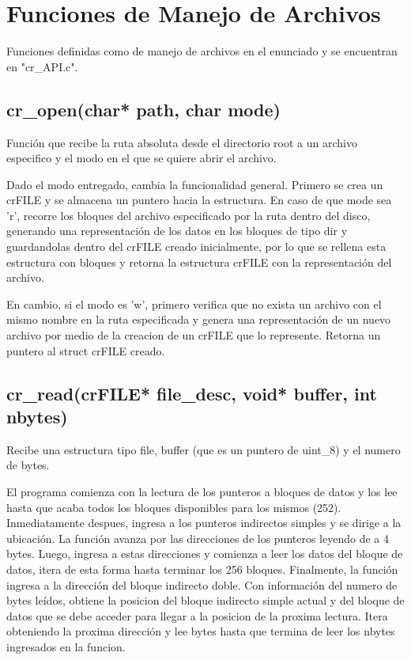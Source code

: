 \documentclass[12pt]{article}
\begin{document}
\section{Funciones de Manejo de Archivos}
Funciones definidas como de manejo de archivos en el enunciado y se encuentran en "cr\_API.c".

\subsection{cr\_open(char* path, char mode)}
Función que recibe la ruta absoluta desde el directorio root a un archivo  especifico y el modo en el que se quiere abrir el archivo.

Dado el modo entregado, cambia la funcionalidad general. Primero se crea un crFILE y se almacena un puntero hacia la estructura. En caso de que mode sea 'r', recorre los bloques del archivo especificado por la ruta dentro del disco, generando una representación de los datos en los bloques de tipo dir y guardandolas dentro del crFILE creado inicialmente, por lo que se rellena esta estructura con bloques y retorna la estructura crFILE con la representación del archivo.

En cambio, si el modo es 'w', primero verifica que no exista un archivo con el mismo nombre en la ruta especificada y genera una representación de un nuevo archivo por medio de la creacion de un crFILE que lo represente. Retorna un puntero al struct crFILE creado.

\subsection{cr\_read(crFILE* file\_desc, void* buffer, int nbytes)}
Recibe una estructura tipo file, buffer (que es un puntero de uint\_8) y el numero de bytes. 

El programa comienza con la lectura de los punteros a bloques de datos y los lee hasta que acaba todos los bloques disponibles para los mismos (252). Inmediatamente despues, ingresa a los punteros indirectos simples y se dirige a la ubicación. La función avanza por las direcciones de los punteros leyendo de a 4 bytes. Luego, ingresa a estas direcciones y comienza a leer los datos del bloque de datos, itera de esta forma hasta terminar los 256 bloques. Finalmente, la función ingresa a la dirección del bloque indirecto doble. Con información del numero de bytes leídos, obtiene la posicion del bloque indirecto simple actual y del bloque de datos que se debe acceder para llegar a la posicion de la proxima lectura. Itera obteniendo la proxima dirección y lee bytes hasta que termina de leer los nbytes ingresados en la funcion.
\end{document}
